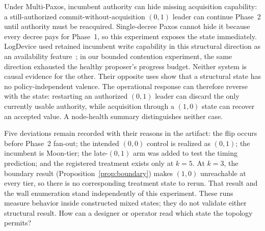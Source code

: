 \documentclass[letterpaper,twocolumn,10pt]{article}
\newcounter{prop}
\newcounter{cor}
\begin{document}
Under Multi-Paxos, incumbent authority can hide missing acquisition capability: a still-authorized commit-without-acquisition $(0,1)$ leader can continue Phase~2 until authority must be reacquired. Single-decree Paxos cannot hide it because every decree pays for Phase~1, so this experiment exposes the state immediately. LogDevice used retained incumbent write capability in this structural direction as an availability feature~\cite{meta2022logdevice}; in our bounded contention experiment, the same direction exhausted the healthy proposer's progress budget. Neither system is causal evidence for the other. Their opposite uses show that a structural state has no policy-independent valence. The operational response can therefore reverse with the state: restarting an authorized $(0,1)$ leader can discard the only currently usable authority, while acquisition through a $(1,0)$ state can recover an accepted value. A node-health summary distinguishes neither case.

Five deviations remain recorded with their reasons in the artifact: the flip occurs before Phase~2 fan-out; the intended $(0,0)$ control is realized as $(0,1)$; the incumbent is Moon-tier; the late-$(0,1)$ arm was added to test the timing prediction; and the registered treatment exists only at $k=5$. At $k=3$, the boundary result (Proposition~\ref{prop:boundary}) makes $(1,0)$ unreachable at every tier, so there is no corresponding treatment state to rerun. That result and the wall enumeration stand independently of this experiment. These runs measure behavior inside constructed mixed states; they do not validate either structural result. How can a designer or operator read which state the topology permits?
\end{document}
